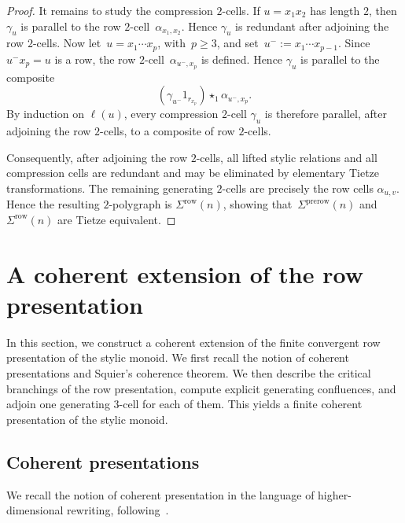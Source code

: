 \documentclass[a4paper, twoside, 11pt, english]{article}
\begin{document}
\begin{proof}
It remains to study the compression $2$-cells. If $u=x_1x_2$ has length $2$,
then $\gamma_u$ is parallel to the row $2$-cell~$\alpha_{x_1,x_2}$.
Hence $\gamma_u$ is redundant after adjoining the row $2$-cells.
Now let~$u=x_1\cdots x_p$, with~$p\ge3$, and set~$u^-:=x_1\cdots x_{p-1}$.
Since $u^-x_p=u$ is a row, the row $2$-cell~$\alpha_{u^-,x_p}$ is defined. Hence $\gamma_u$ is parallel to the composite
\[
(\gamma_{u^-}1_{r_{x_p}})
\star_1
\alpha_{u^-,x_p}.
\]
By induction on $\ell(u)$, every compression $2$-cell $\gamma_u$ is therefore
parallel, after adjoining the row $2$-cells, to a composite of row $2$-cells.

Consequently, after adjoining the row $2$-cells, all lifted stylic relations and
all compression cells are redundant and may be eliminated by elementary Tietze transformations. The remaining generating $2$-cells are precisely the row cells
$\alpha_{u,v}$. Hence the resulting $2$-polygraph is
$\Sigma^{\mathrm{row}}(n)$,  showing that~$\Sigma^{\mathrm{prerow}}(n)$ and~$\Sigma^{\mathrm{row}}(n)$ are Tietze equivalent.
\end{proof}






\section{A coherent extension of the row presentation}
\label{S:CoherentPresentationStylicMonoid}

In this section, we construct a coherent extension of the finite convergent row
presentation of the stylic monoid. We first recall the
notion of coherent presentations and Squier's coherence theorem. We then describe the
critical branchings of the row presentation, compute explicit generating confluences,
and adjoin one generating $3$-cell for each of them. This yields a finite coherent presentation of the stylic monoid.

\subsection{Coherent presentations}
\label{SS:CoherentPresentations}
We recall the notion of coherent presentation in the language of higher-dimensional rewriting, following~\cite{GuiraudMalbos18,GaussentGuiraudMalbos15,PolygraphsBook}.
\end{document}
